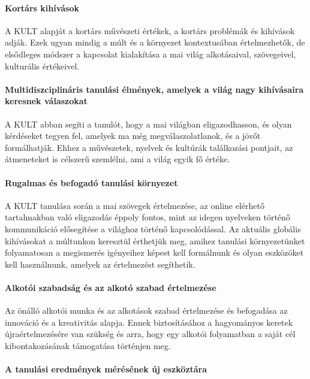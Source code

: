 \paragraph{Kortárs kihívások}

A KULT alapját a kortárs művészeti értékek, a kortárs problémák és kihívások adják. Ezek ugyan mindig a múlt és a környezet kontextusában értelmezhetők, de elsődleges módszer a kapcsolat kialakítása a mai világ alkotásaival, szövegeivel, kulturális értékeivel.

\paragraph{Multidiszciplináris tanulási élmények, amelyek a világ nagy kihívásaira keresnek válaszokat}

A KULT abban segíti a tanulót,  hogy a mai világban eligazodhasson, és olyan kérdéseket tegyen fel, amelyek ma még megválaszolatlanok, és a jövőt formálhatják. Ehhez a művészetek, nyelvek és kultúrák találkozási pontjait, az átmeneteket is célszerű szemlélni, ami a világ egyik fő értéke.

\paragraph{Rugalmas és befogadó tanulási környezet}

A KULT tanulása során a mai szövegek értelmezése, az online elérhető tartalmakban való eligazodás éppoly fontos, mint az idegen nyelveken történő kommunikáció elősegítése a világhoz történő kapcsolódással. Az aktuális globális kihívásokat a múltunkon keresztül érthetjük meg, amihez tanulási környezetünket folyamatosan a megismerés igényeihez képest kell formálnunk és olyan eszközöket kell használnunk, amelyek az értelmezést segíthetik.

\paragraph{Alkotói szabadság és az alkotó szabad értelmezése}

Az önálló alkotói munka és az alkotások szabad értelmezése és befogadása az innováció és a kreativitás alapja. Ennek biztosításához a hagyományos keretek újraértelmezésére van szükség és arra, hogy egy alkotói folyamatban a saját cél kibontakozásának támogatása történjen meg.

\paragraph{A tanulási eredmények mérésének új eszköztára}

